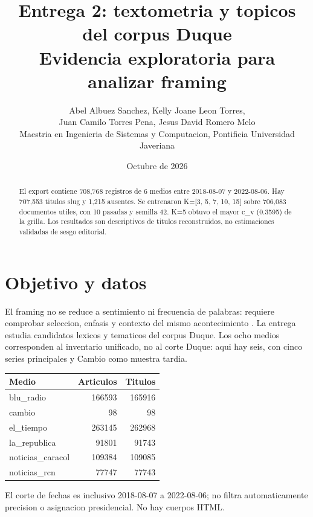 \documentclass[10pt,twocolumn]{article}
\title{Entrega 2: textometria y topicos del corpus Duque\\Evidencia exploratoria para analizar framing}
\author{Abel Albuez Sanchez, Kelly Joane Leon Torres,\\Juan Camilo Torres Pena, Jesus David Romero Melo\\\small Maestria en Ingenieria de Sistemas y Computacion, Pontificia Universidad Javeriana}
\date{Octubre de 2026}
\begin{document}
\maketitle
\begin{abstract}
El export contiene 708,768 registros de 6 medios entre 2018-08-07 y 2022-08-06. Hay 707,553 titulos slug y 1,215 ausentes. Se entrenaron K=[3, 5, 7, 10, 15] sobre 706,083 documentos utiles, con 10 pasadas y semilla 42. K=5 obtuvo el mayor c\_v (0.3595) de la grilla. Los resultados son descriptivos de titulos reconstruidos, no estimaciones validadas de sesgo editorial.
\end{abstract}
\section{Objetivo y datos}
El framing no se reduce a sentimiento ni frecuencia de palabras: requiere comprobar seleccion, enfasis y contexto del mismo acontecimiento \cite{entman}. La entrega estudia candidatos lexicos y tematicos del corpus Duque. Los ocho medios corresponden al inventario unificado, no al corte Duque: aqui hay seis, con cinco series principales y Cambio como muestra tardia.
\begin{center}\begin{tabular}{lrr}\toprule Medio & Articulos & Titulos\\\midrule
blu\_radio & 166593 & 165916 \\
cambio & 98 & 98 \\
el\_tiempo & 263145 & 262968 \\
la\_republica & 91801 & 91743 \\
noticias\_caracol & 109384 & 109085 \\
noticias\_rcn & 77747 & 77743 \\
\bottomrule\end{tabular}\end{center}
El corte de fechas es inclusivo 2018-08-07 a 2022-08-06; no filtra automaticamente precision o asignacion presidencial. No hay cuerpos HTML.
\end{document}
